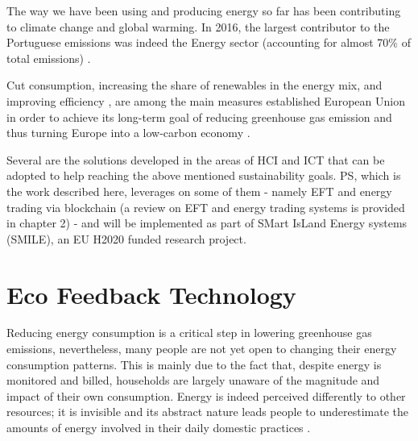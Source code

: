 \label{chap:intro}
\cleardoublepage
The way we have been using and producing energy so far has been contributing to climate change and global warming. In 2016, the largest contributor to the Portuguese emissions was indeed the Energy sector (accounting for almost 70\% of total emissions)\cite{NacionalReport} .


Cut consumption, increasing  the share of renewables in the energy mix, and improving efficiency \cite{Europa1, Europa2, Europa3}, are among the main measures established European Union in order to achieve its long-term goal of reducing greenhouse gas emission and thus turning Europe into a low-carbon economy \cite{Europa2050}.


Several are the solutions developed in the areas of \ac{HCI} and \ac{ICT} that can be adopted to help reaching the above mentioned sustainability goals. \ac{PS}, which is the work described here, leverages on some of them - namely \ac{EFT} and energy trading via blockchain (a review on \ac{EFT} and energy trading systems is provided in chapter 2) - and will be implemented as part of SMart IsLand Energy systems (SMILE), an EU H2020 funded research project.




\section{Eco Feedback Technology}

Reducing energy consumption is a critical step in lowering greenhouse gas emissions, nevertheless, many people are not yet open to changing their energy consumption patterns. This is mainly due to the fact that, despite energy is monitored and billed, households are largely unaware of the magnitude and impact of their own consumption. Energy is indeed perceived differently to other resources; it is invisible and its abstract nature leads people to underestimate the amounts of energy involved in their daily domestic practices \cite{ReducingDomesticEnergy}.



